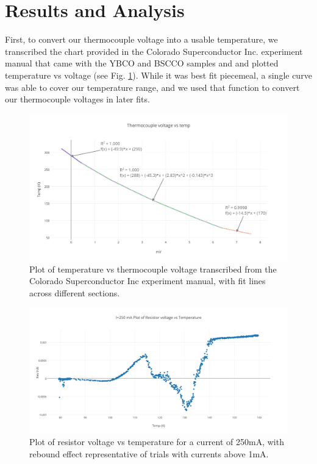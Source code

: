 \documentclass[prb,preprint]{revtex4-1}
\begin{document}
\section{Results and Analysis}

First, to convert our thermocouple voltage into a usable temperature, we transcribed the chart provided in the Colorado Superconductor Inc. experiment manual that came with the YBCO and BSCCO samples and and plotted temperature vs voltage (see Fig. \ref{TCplot}). While it was best fit piecemeal, a single curve was able to cover our temperature range, and we used that function to convert our thermocouple voltages in later fits.

\begin{figure}[h!]
\centering
\includegraphics[width=7in]{thermocouple_voltage_vs_temp.png}
\caption{Plot of temperature vs thermocouple voltage transcribed from the Colorado Superconductor Inc experiment manual, with fit lines across different sections.}
\label{TCplot}
\end{figure}

\begin{figure}[h!]
\centering
\includegraphics[width=7in]{i250_ma_plot_of_resistor_voltage_vs_temperature.png}
\caption{Plot of resistor voltage vs temperature for a current of 250mA, with rebound effect representative of trials with currents above 1mA.}
\label{ReboundPlot}
\end{figure}
\end{document}
